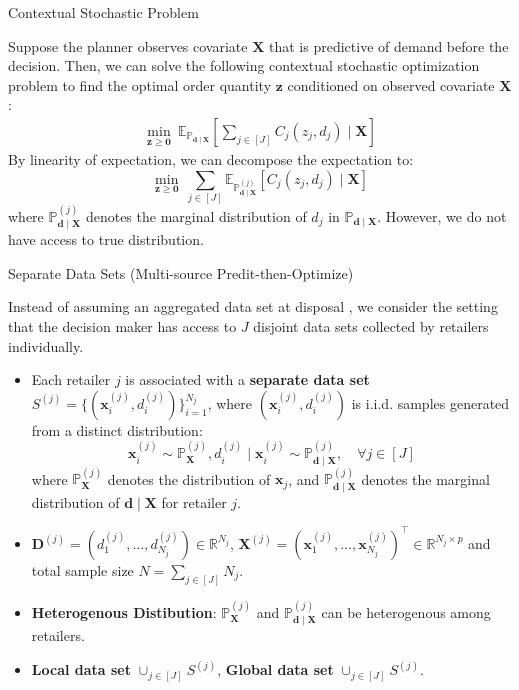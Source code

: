 \documentclass{beamer}
\newcommand{\mb}[1]{{\mathbf{#1}}}
\newcommand{\txrd}[1]{{\textcolor{sintefred}{\textbf{#1}}}}
\newcommand{\bbp}{\mathbb{P}}
\newcommand{\bbr}{\mathbb{R}}
\begin{document}
\begin{frame}{Contextual Stochastic Problem}

Suppose the planner observes covariate $\mb X$ that is predictive of demand before the decision. Then, we can solve the following contextual stochastic optimization problem to find the optimal order quantity $\bm z$ conditioned on observed covariate $\mb X$ \citep{Ban_Rudin_2019big}: 
{\large
\begin{align}
\min_{\bm z \geq \bm 0} \  \mathbb{E}_{\bbp_{\bm d \mid \mb X}} \left[\sum_{j \in [J]}   C_j (z_j,  d_j)  \mid \mb X \right] 
\label{problem: contextual stochastic optimization}
\end{align}
}
\vspace{0.3cm}
By linearity of expectation, we can decompose the expectation to:
{\large
\[
\min_{\bm z \geq \bm 0} \ \sum_{j \in [J]} \mathbb{E}_{\bbp^{(j)}_{\bm d \mid \mb X}} \left[  C_j (z_j,  d_j)  \mid \mb X \right]
\]
}
where $ {\bbp^{(j)}_{\bm d \mid \mb X}}$ denotes the marginal distribution of $d_j$ in $\bbp_{\bm d \mid \mb X}$. However, we do not have access to true distribution.

\end{frame}



\begin{frame}{Separate Data Sets (Multi-source Predit-then-Optimize)}

Instead of assuming an aggregated data set at disposal \citep{notz2022prescriptive}, we consider the setting that the decision maker has access to $J$ \alert{disjoint data sets collected by retailers individually}.

\begin{itemize}
    \item Each retailer $j$ is associated with a \txrd{separate data set} $S^{(j)}=\{({\bm x}_i^{(j)},{d}_i^{(j)})\}_{i = 1}^{N_j}$, where $({\bm x}_i^{(j)},{ d}_i^{(j)})$ is i.i.d. samples generated from a distinct distribution:
    {\large
    \[
    {\bm x}_i^{(j)} \sim \bbp^{(j)}_{\mb X}, { d}_i^{(j)} \mid {\bm x}_i^{(j)} \sim \bbp^{(j)}_{\bm d \mid \mb X}, \quad \forall j \in [J]
    \]
    }
    where $\bbp^{(j)}_{\mb X}$ denotes the distribution of $\bm x_j$, and $\bbp^{(j)}_{\bm d \mid \mb X}$ denotes the marginal distribution of ${\bm d \mid \mb X}$ for retailer $j$.
    \item $\mb D^{(j)} = ({ d}_{1}^{(j)}, \ldots, { d}_{N_j}^{(j)}) \in \bbr^{N_j}$, $\mb X^{(j)} = ({\bm x}_{1}^{(j)}, \ldots, {\bm x}_{N_j}^{(j)})^\top \in \bbr^{N_j \times p} $ and total sample size $N = \sum_{j \in [J]} N_j$.
    \item \txrd{Heterogenous Distibution}: $\bbp^{(j)}_{\mb X}$ and $\bbp^{(j)}_{\bm d \mid \mb X}$  can be heterogenous among retailers.
    \item \txrd{Local data set} $\cup_{j \in [J]} S^{(j)}$, \txrd{Global data set} $\cup_{j \in [J]} S^{(j)}$.
    \end{itemize}

\end{frame}
\end{document}
